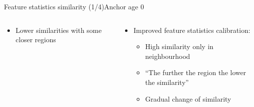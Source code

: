 \begin{frame}{Feature statistics similarity (1/4)}{Anchor age 0}
\begin{columns}
\begin{column}{0.5\textwidth}
\begin{itemize}
				\item Lower similarities with some closer regions
			\end{itemize}
		\end{column}
		\begin{column}{0.5\textwidth}
			\begin{itemize}
				\item Improved feature statistics calibration:
				\begin{itemize}
					\vspace{-1.5em}
					\scriptsize
					\item High similarity only in neighbourhood
					\item ``The further the region the lower the similarity''
					\item Gradual change of similarity
				\end{itemize}
			\end{itemize}
		\end{column}
	\end{columns}
\end{frame}

